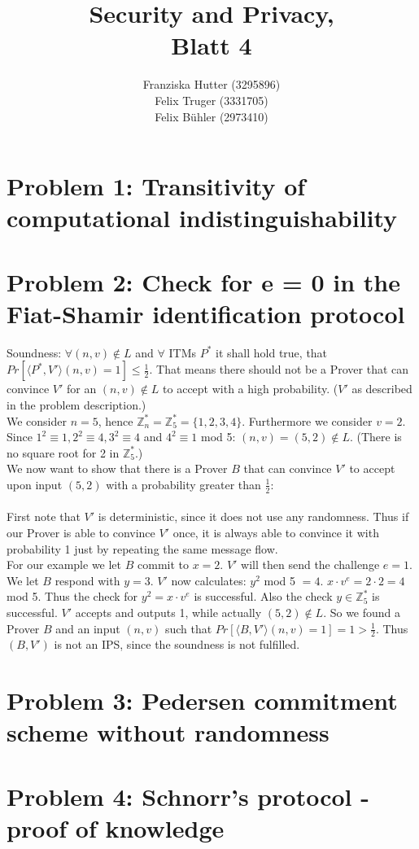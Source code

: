 \documentclass[12pt,pdftex,a4paper]{article}
\title{Security and Privacy,\\ Blatt 4}
\author{Franziska Hutter (3295896)\\
	Felix Truger (3331705)\\
	Felix Bühler (2973410)}
\begin{document}
\maketitle
\pagebreak

\section*{Problem 1: Transitivity of computational indistinguishability}

\section*{Problem 2: Check for e = 0 in the Fiat-Shamir identification protocol}
Soundness: $\forall	(n, v) \notin L$ and $\forall$ ITMs $P^*$ it shall hold true, that $Pr[\langle P^*, V'\rangle (n, v) = 1]\leq \frac{1}{2}$. That means there should not be a Prover that can convince $V'$ for an $(n, v)\notin L$ to accept with a high probability. ($V'$ as described in the problem description.)\\
We consider $n=5$, hence $\mathbb{Z}_{n}^* = \mathbb{Z}_{5}^* = \{1, 2, 3, 4\}$. Furthermore we consider $v = 2$. Since $1^2\equiv 1, 2^2\equiv 4, 3^2\equiv 4$ and $4^2\equiv 1$ mod 5: $(n, v) = (5, 2) \notin L$. (There is no square root for 2 in $\mathbb{Z}_5^*$.)\\
We now want to show that there is a Prover $B$ that can convince $V'$ to accept upon input $(5, 2)$ with a probability greater than $\frac{1}{2}$:\\~\\
First note that $V'$ is deterministic, since it does not use any randomness. Thus if our Prover is able to convince $V'$ once, it is always able to convince it with probability 1 just by repeating the same message flow.\\
For our example we let $B$ commit to $x=2$. $V'$ will then send the challenge $e=1$. We let $B$ respond with $y=3$. $V'$ now calculates: $y^2$ mod 5 $=4$. $x\cdot v^e = 2\cdot 2 = 4$ mod 5. Thus the check for $y^2 = x\cdot v^e$ is successful. Also the check $y\in \mathbb{Z}_5^*$ is successful. $V'$ accepts and outputs 1, while actually $(5, 2) \notin L$.
So we found a Prover $B$ and an input $(n, v)$ such that $Pr[\langle B, V'\rangle (n, v) = 1]=1>\frac{1}{2}$. Thus $(B, V')$ is not an IPS, since the soundness is not fulfilled.

\section*{Problem 3: Pedersen commitment scheme without randomness}

\section*{Problem 4: Schnorr’s protocol - proof of knowledge}
\end{document}

